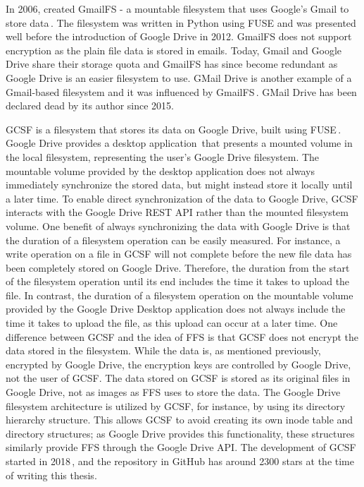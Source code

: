 In 2006, \citeauthor{jonesGoogleHackUse2006} created GmailFS - a mountable filesystem that uses Google's Gmail to store data\,\cite{jonesGoogleHackUse2006, jonesGmailFilesystemImplementation2006}. The filesystem was written in Python using \gls{FUSE} and was presented well before the introduction of Google Drive in 2012. GmailFS does not support encryption as the plain file data is stored in emails. Today, Gmail and Google Drive share their storage quota and GmailFS has since become redundant as Google Drive is an easier filesystem to use. GMail Drive is another example of a \mbox{Gmail-based} filesystem and it was influenced by GmailFS\,\cite{viksoeViksoeDkGMail2004}. GMail Drive has been declared dead by its author since 2015.

\gls{GCSF} is a filesystem that stores its data on Google Drive, built using \gls{FUSE}\,\cite{sergiudanGCSFVirtualFile2018,sergiudanHarababurelGcsf2021}. Google Drive provides a desktop application\,\cite{googleInstallSetGoogle} that presents a mounted volume in the local filesystem, representing the user's Google Drive filesystem. The mountable volume provided by the desktop application does not always immediately synchronize the stored data, but might instead store it locally until a later time. To enable direct synchronization of the data to Google Drive, \gls{GCSF} interacts with the Google Drive REST \gls{API} rather than the mounted filesystem volume. One benefit of always synchronizing the data with Google Drive is that the duration of a filesystem operation can be easily measured. For instance, a write operation on a file in \gls{GCSF} will not complete before the new file data has been completely stored on Google Drive. Therefore, the duration from the start of the filesystem operation until its end includes the time it takes to upload the file. In contrast, the duration of a filesystem operation on the mountable volume provided by the Google Drive Desktop application does not always include the time it takes to upload the file, as this upload can occur at a later time. One difference between \gls{GCSF} and the idea of \gls{FFS} is that \gls{GCSF} does not encrypt the data stored in the filesystem. While the data is, as mentioned previously, encrypted by Google Drive, the encryption keys are controlled by Google Drive, not the user of \gls{GCSF}. The data stored on \gls{GCSF} is stored as its original files in Google Drive, not as images as \gls{FFS} uses to store the data. The Google Drive filesystem architecture is utilized by \gls{GCSF}, for instance, by using its directory hierarchy structure. This allows \gls{GCSF} to avoid creating its own inode table and directory structures; as Google Drive provides this functionality, these structures similarly provide \gls{FFS} through the Google Drive \gls{API}. The development of \gls{GCSF} started in 2018\,\cite{sergiudanHarababurelGcsf2021}, and the repository in GitHub has around \num{2300} stars at the time of writing this thesis. 

